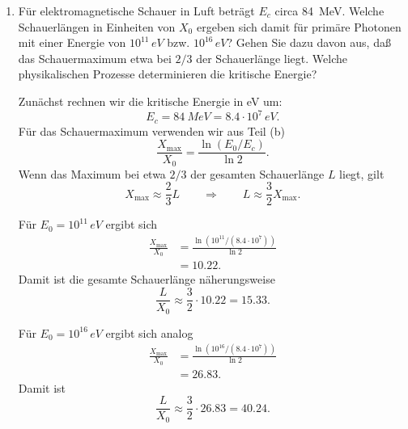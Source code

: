 \documentclass[11pt,a4paper]{scrartcl}
\begin{document}
\begin{enumerate}[label=(\alph*)]
        \item
            Für elektromagnetische Schauer in Luft beträgt $E_c$ circa \SI{84}{MeV}.
            Welche Schauerlängen in Einheiten von $X_0$ ergeben sich damit für primäre
            Photonen mit einer Energie von $10^{11}\,\si{eV}$ bzw. $10^{16}\,\si{eV}$?
            Gehen Sie dazu davon aus, daß das Schauermaximum etwa bei $2/3$ der
            Schauerlänge liegt. Welche physikalischen Prozesse determinieren die kritische
            Energie?

            \begin{calculationbox}
                Zunächst rechnen wir die kritische Energie in eV um:
                \[
                    E_c=\SI{84}{MeV}=8.4\cdot 10^7\,\si{eV}.
                \]
                Für das Schauermaximum verwenden wir aus Teil (b)
                \[
                    \frac{X_{\max}}{X_0}=\frac{\ln(E_0/E_c)}{\ln 2}.
                \]
                Wenn das Maximum bei etwa $2/3$ der gesamten Schauerlänge $L$ liegt, gilt
                \[
                    X_{\max}\approx \frac{2}{3}L
                    \qquad\Longrightarrow\qquad
                    L\approx \frac{3}{2}X_{\max}.
                \]

                \begin{calculationbox}
                    Für $E_0=10^{11}\,\si{eV}$ ergibt sich
                    \begin{align*}
                        \frac{X_{\max}}{X_0}
                        &=\frac{\ln(10^{11}/(8.4\cdot10^7))}{\ln2}\\
                        &=10.22.
                    \end{align*}
                    Damit ist die gesamte Schauerlänge näherungsweise
                    \[
                        \frac{L}{X_0}\approx\frac{3}{2}\cdot 10.22=15.33.
                    \]
                \end{calculationbox}

                \begin{calculationbox}
                    Für $E_0=10^{16}\,\si{eV}$ ergibt sich analog
                    \begin{align*}
                        \frac{X_{\max}}{X_0}
                        &=\frac{\ln(10^{16}/(8.4\cdot10^7))}{\ln2}\\
                        &=26.83.
                    \end{align*}
                    Damit ist
                    \[
                        \frac{L}{X_0}\approx\frac{3}{2}\cdot 26.83=40.24.
                    \]
                \end{calculationbox}


\end{calculationbox}
\end{enumerate}
\end{document}

